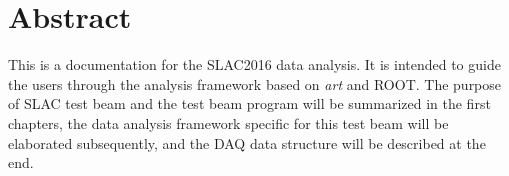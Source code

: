 \section*{Abstract}

This is a documentation for the SLAC2016 data analysis. It is intended to guide the users through the analysis framework based on \textit{art} and ROOT. The purpose of SLAC test beam and the test beam program will be summarized in the first chapters, the data analysis framework specific for this test beam will be elaborated subsequently, and the DAQ data structure will be described at the end.
